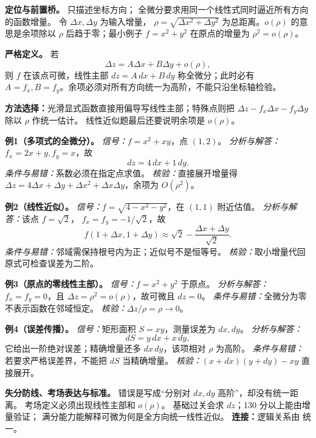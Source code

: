 
\begin{knowledgeBox}
\textbf{定位与前置桥。}
只描述坐标方向；
全微分要求用同一个线性式同时逼近所有方向的函数增量。
令 \(\Delta x,\Delta y\) 为输入增量，
\(\rho=\sqrt{\Delta x^2+\Delta y^2}\) 为总距离。\(o(\rho)\) 的意思是余项除以
\(\rho\) 后趋于零；最小例子 \(f=x^2+y^2\) 在原点的增量为
\(\rho^2=o(\rho)\)。

\textbf{严格定义。}
若
\[
\Delta z=A\Delta x+B\Delta y+o(\rho),
\]
则 \(f\) 在该点可微，线性主部
\(dz=A\,dx+B\,dy\) 称全微分；此时必有
\(A=f_x,B=f_y\)。余项必须对所有方向统一为高阶，不能只沿坐标轴检验。

\textbf{方法选择：}光滑显式函数直接用偏导写线性主部；特殊点则把
\(\Delta z-f_x\Delta x-f_y\Delta y\) 除以 \(\rho\) 作统一估计。
线性近似题最后还要说明余项是 \(o(\rho)\)。

\textbf{例1（多项式的全微分）。}
\emph{信号：}\(f=x^2+xy\)，点 \((1,2)\)。
\emph{分析与解答：}\(f_x=2x+y,f_y=x\)，故
\[
dz=4\,dx+1\,dy.
\]
\emph{条件与易错：}系数必须在指定点求值。
\emph{核验：}直接展开增量得
\(\Delta z=4\Delta x+\Delta y+\Delta x^2+\Delta x\Delta y\)，余项为 \(O(\rho^2)\)。

\textbf{例2（线性近似）。}
\emph{信号：}\(f=\sqrt{4-x^2-y^2}\)，在 \((1,1)\) 附近估值。
\emph{分析与解答：}该点 \(f=\sqrt2\)，
\(f_x=f_y=-1/\sqrt2\)，故
\[
f(1+\Delta x,1+\Delta y)
\approx\sqrt2-\frac{\Delta x+\Delta y}{\sqrt2}.
\]
\emph{条件与易错：}邻域需保持根号内为正；近似号不是恒等号。
\emph{核验：}取小增量代回原式可检查误差为二阶。

\textbf{例3（原点的零线性主部）。}
\emph{信号：}\(f=x^2+y^2\) 于原点。
\emph{分析与解答：}\(f_x=f_y=0\)，且
\(\Delta z=\rho^2=o(\rho)\)，故可微且 \(dz=0\)。
\emph{条件与易错：}全微分为零不表示函数在邻域恒定。
\emph{核验：}\(\Delta z/\rho=\rho\to0\)。

\textbf{例4（误差传播）。}
\emph{信号：}矩形面积 \(S=xy\)，测量误差为 \(dx,dy\)。
\emph{分析与解答：}
\[
dS=y\,dx+x\,dy,
\]
它给出一阶绝对误差；精确增量还多 \(dx\,dy\)，该项相对
\(\rho\) 为高阶。
\emph{条件与易错：}若要求严格误差界，不能把 \(dS\) 当精确增量。
\emph{核验：}\((x+dx)(y+dy)-xy\) 直接展开。

\textbf{失分防线、考场表达与标准。}
错误是写成“分别对 \(dx,dy\) 高阶”，却没有统一距离。
考场定义必须出现线性主部和 \(o(\rho)\)。
基础过关会求 \(dz\)；130 分以上能由增量验证；
满分能力能解释可微为何是全方向统一线性近似。
\textbf{连接：}逻辑关系由
统一。
\end{knowledgeBox}

